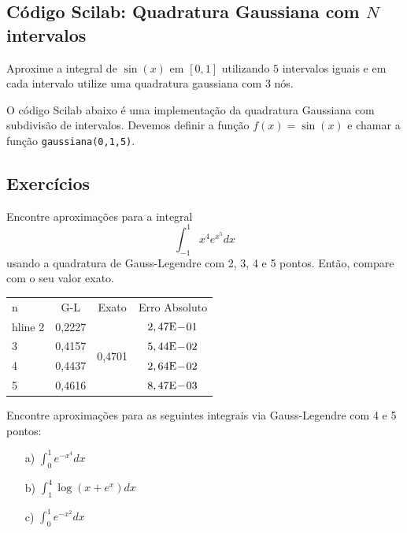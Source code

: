 \ifisscilab
\subsection{Código Scilab: Quadratura Gaussiana com $N$ intervalos}
\begin{ex}
Aproxime a integral de $\sin(x)$ em $[0,1]$ utilizando $5$ intervalos iguais e em cada intervalo utilize uma quadratura gaussiana com $3$ nós. 
\end{ex}

O código Scilab abaixo é uma implementação da quadratura Gaussiana com subdivisão de intervalos. Devemos definir a função $f(x)=\sin(x)$ e chamar a função \verb#gaussiana(0,1,5)#.


\fi

\subsection*{Exercícios}

\begin{exer}Encontre aproximações para a integral 
$$\int_{-1}^1 x^4e^{x^5}dx$$
usando a quadratura de Gauss-Legendre com 2, 3, 4 e 5 pontos. Então, compare com o seu valor exato.
\end{exer}
\begin{resp}
  \begin{center}
    \begin{tabular}{l|ccc}
      n& G-L& Exato& Erro Absoluto\\hline
      2& 0,2227 & \multirow{4}{*}{0,4701} & $2,47\mathrm{E}\!-\!01$\\
      3& 0,4157 & & $5,44\mathrm{E}\!-\!02$\\
      4& 0,4437 & & $2,64\mathrm{E}\!-\!02$\\
      5& 0,4616 & & $8,47\mathrm{E}\!-\!03$
    \end{tabular}
  \end{center}
\end{resp}

\begin{exer} Encontre aproximações para as seguintes integrais via Gauss-Legendre com 4 e 5 pontos:
\begin{itemize}
\item[a)] $\int_0^1 e^{-x^4}dx$
\item[b)] $\int_1^4 \log(x+e^x)dx$
\item[c)] $\int_0^1 e^{-x^2}dx$
\end{itemize}
\end{exer}

